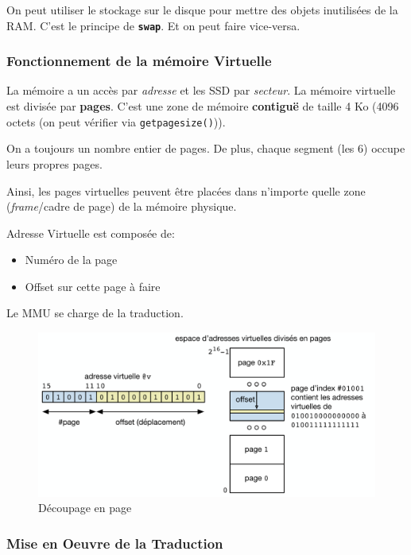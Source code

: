On peut utiliser le stockage sur le disque pour mettre des objets
inutilisées de la RAM. C'est le principe de \textbf{\texttt{swap}}. Et
on peut faire vice-versa.

\subsubsection{Fonctionnement de la mémoire
Virtuelle}\label{fonctionnement-de-la-muxe9moire-virtuelle}

La mémoire a un accès par \emph{adresse} et les SSD par \emph{secteur}.
La mémoire virtuelle est divisée par \textbf{pages}. C'est une zone de
mémoire \textbf{contiguë} de taille 4 Ko (4096 octets (on peut vérifier
via \texttt{getpagesize()})).

On a toujours un nombre entier de pages. De plus, chaque segment (les 6)
occupe leurs propres pages.

Ainsi, les pages virtuelles peuvent être placées dans n'importe quelle
zone (\emph{frame}/cadre de page) de la mémoire physique.

Adresse Virtuelle est composée de:

\begin{itemize}
\tightlist
\item
  Numéro de la page
\item
  Offset sur cette page à faire
\end{itemize}

Le MMU se charge de la traduction.

\begin{figure}
\centering
\includegraphics{image-53.png}
\caption{Découpage en page}
\end{figure}

\subsubsection{Mise en Oeuvre de la
Traduction}\label{mise-en-oeuvre-de-la-traduction}

